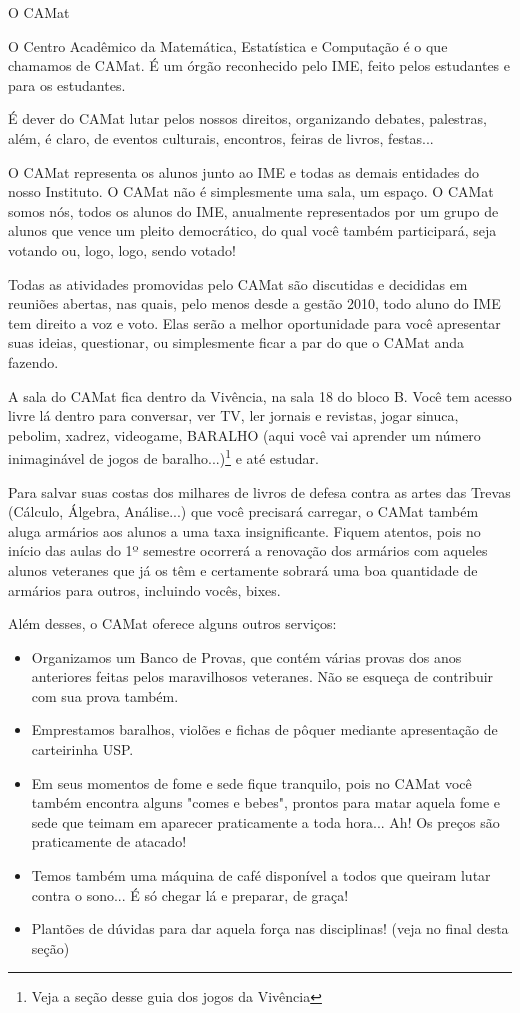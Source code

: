 \begin{secao}{O CAMat}

O Centro Acadêmico da Matemática, Estatística e Computação é o que chamamos de
CAMat. É um órgão reconhecido pelo IME, feito pelos estudantes e para os
estudantes.

É dever do CAMat lutar pelos nossos direitos, organizando debates, palestras,
além, é claro, de eventos culturais, encontros, feiras de livros, festas...

O CAMat representa os alunos junto ao IME e todas as demais entidades do nosso
Instituto. O CAMat não é simplesmente uma sala, um espaço. O CAMat somos nós,
todos os alunos do IME, anualmente representados por um grupo de alunos que
vence um pleito democrático, do qual você também participará, seja votando ou,
logo, logo, sendo votado!

Todas as atividades promovidas pelo CAMat são discutidas e decididas em
reuniões abertas, nas quais, pelo menos desde a gestão 2010, todo aluno do IME tem
direito a voz e voto. Elas serão a melhor oportunidade para você apresentar suas
ideias, questionar, ou simplesmente ficar a par do que o CAMat
anda fazendo.

A sala do CAMat  fica dentro da Vivência, na sala 18 do bloco B. Você tem acesso
livre lá dentro para conversar, ver TV, ler jornais e revistas, jogar sinuca,
pebolim, xadrez, videogame, BARALHO (aqui você vai aprender um número inimaginável de
jogos de baralho...)\footnote{Veja a seção desse guia dos jogos da
Vivência} e até estudar.

Para salvar suas costas dos milhares de livros de defesa contra as artes das
Trevas (Cálculo, Álgebra, Análise...) que você precisará carregar, o CAMat
também aluga armários aos alunos a uma taxa insignificante. Fiquem atentos, pois no
início das aulas do 1º semestre ocorrerá a renovação dos armários com
aqueles alunos veteranes que já os têm e certamente sobrará uma boa quantidade
de armários para outros, incluindo vocês, bixes.

Além desses, o CAMat oferece alguns outros serviços:

\begin{itemize}
  \item Organizamos um Banco de Provas, que contém várias provas dos anos
    anteriores feitas pelos maravilhosos veteranes. Não se esqueça de contribuir
    com sua prova também.
  \item Emprestamos baralhos, violões e fichas de pôquer mediante apresentação
    de carteirinha USP.
  \item Em seus momentos de fome e sede fique tranquilo, pois no CAMat você
    também encontra alguns "comes e bebes", prontos para matar aquela fome e
    sede que teimam em aparecer praticamente a toda hora... Ah! Os preços são
    praticamente de atacado!
  \item Temos também uma máquina de café disponível a todos que queiram lutar
    contra o sono... É só chegar lá e preparar, de graça!
  \item Plantões de dúvidas para dar aquela força nas disciplinas! (veja no
    final desta seção)
\end{itemize}


\end{secao}
